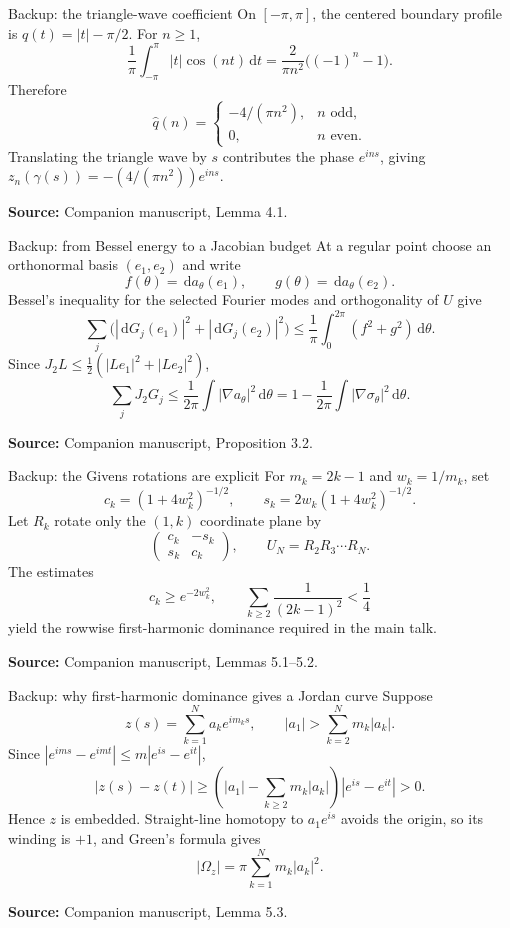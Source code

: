 \documentclass[11pt,aspectratio=169,usepdftitle=false]{beamer}
\newcommand{\dd}{\,\mathrm d}
\newcommand{\sourcefoot}[1]{\par\vfill{\tiny\color{Slate}\textbf{Source:} #1}}
\begin{document}
\begin{frame}{Backup: the triangle-wave coefficient}\label{bk:triangle}
  On $[-\pi,\pi]$, the centered boundary profile is
  $q(t)=|t|-\pi/2$. For $n\ge1$,
  \[
    \frac1\pi\int_{-\pi}^{\pi}|t|\cos(nt)\dd t
    =\frac{2}{\pi n^2}\bigl((-1)^n-1\bigr).
  \]
  Therefore
  \[
    \widehat q(n)=
    \begin{cases}
      -4/(\pi n^2),&n\text{ odd},\\
      0,&n\text{ even}.
    \end{cases}
  \]
  Translating the triangle wave by $s$ contributes the phase $e^{ins}$, giving
  $z_n(\gamma(s))=-(4/(\pi n^2))e^{ins}$.
  \sourcefoot{Companion manuscript, Lemma 4.1.}
\end{frame}

\begin{frame}{Backup: from Bessel energy to a Jacobian budget}\label{bk:budget-proof}
  At a regular point choose an orthonormal basis $(e_1,e_2)$ and write
  \[
    f(\theta)=\dd a_\theta(e_1),\qquad
    g(\theta)=\dd a_\theta(e_2).
  \]
  Bessel's inequality for the selected Fourier modes and orthogonality of $U$
  give
  \[
    \sum_j\bigl(|\dd G_j(e_1)|^2+|\dd G_j(e_2)|^2\bigr)
    \le\frac1\pi\int_0^{2\pi}(f^2+g^2)\dd\theta.
  \]
  Since $J_2L\le\tfrac12(|L e_1|^2+|L e_2|^2)$,
  \[
    \sum_jJ_2G_j
    \le\frac1{2\pi}\int|\nabla a_\theta|^2\dd\theta
    =1-\frac1{2\pi}\int|\nabla\sigma_\theta|^2\dd\theta.
  \]
  \sourcefoot{Companion manuscript, Proposition 3.2.}
\end{frame}

\begin{frame}{Backup: the Givens rotations are explicit}\label{bk:givens}
  For $m_k=2k-1$ and $w_k=1/m_k$, set
  \[
    c_k=(1+4w_k^2)^{-1/2},\qquad
    s_k=2w_k(1+4w_k^2)^{-1/2}.
  \]
  Let $R_k$ rotate only the $(1,k)$ coordinate plane by
  \[
    \begin{pmatrix}c_k&-s_k\\s_k&c_k\end{pmatrix},
    \qquad U_N=R_2R_3\cdots R_N.
  \]
  The estimates
  \[
    c_k\ge e^{-2w_k^2},\qquad
    \sum_{k\ge2}\frac1{(2k-1)^2}<\frac14
  \]
  yield the rowwise first-harmonic dominance required in the main talk.
  \sourcefoot{Companion manuscript, Lemmas 5.1--5.2.}
\end{frame}

\begin{frame}{Backup: why first-harmonic dominance gives a Jordan curve}\label{bk:jordan}
  Suppose
  \[
    z(s)=\sum_{k=1}^{N}a_ke^{im_ks},
    \qquad
    |a_1|>\sum_{k=2}^{N}m_k|a_k|.
  \]
  Since $|e^{ims}-e^{imt}|\le m|e^{is}-e^{it}|$,
  \[
    |z(s)-z(t)|\ge
    \left(|a_1|-\sum_{k\ge2}m_k|a_k|\right)|e^{is}-e^{it}|>0.
  \]
  Hence $z$ is embedded. Straight-line homotopy to $a_1e^{is}$ avoids the
  origin, so its winding is $+1$, and Green's formula gives
  \[
    |\Omega_z|=\pi\sum_{k=1}^{N}m_k|a_k|^2.
  \]
  \sourcefoot{Companion manuscript, Lemma 5.3.}
\end{frame}
\end{document}
